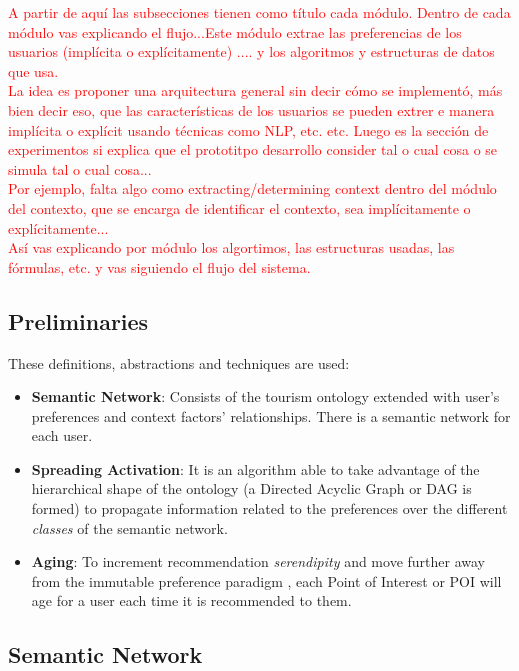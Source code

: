 \textcolor{red}{A partir de aquí las subsecciones tienen como título cada módulo. Dentro de cada módulo vas explicando el flujo...Este módulo extrae las preferencias de los usuarios (implícita o explícitamente) .... y los algoritmos y estructuras de datos que usa.\\ 
La idea es proponer una arquitectura general sin decir cómo se implementó, más bien decir eso, que las características de los usuarios se pueden extrer e manera implícita o explícit usando técnicas como NLP, etc. etc. Luego es la sección de experimentos si explica que el prototitpo desarrollo consider tal o cual cosa o se simula tal o cual cosa...\\
Por ejemplo, falta algo como extracting/determining context dentro del módulo del contexto, que se encarga de identificar el contexto, sea implícitamente o explícitamente...\\
Así vas explicando por módulo los algortimos, las estructuras usadas, las fórmulas, etc. y vas siguiendo el flujo del sistema.}

\subsection{Preliminaries}
These definitions, abstractions and techniques are used:
\begin{itemize}
\item \textbf{Semantic Network}: Consists of the tourism ontology extended with user's preferences and context factors' relationships. There is a semantic network for each user.
\item \textbf{Spreading Activation}: It is an algorithm able to take advantage of the hierarchical shape of the ontology (a Directed Acyclic Graph or DAG is formed) to propagate information related to the preferences over the different \textit{classes} of the semantic network.
\item \textbf{Aging}: To increment recommendation \textit{serendipity} \cite{kotkov2016survey} and move further away from the immutable preference paradigm \cite{pagano2016contextual}, each Point of Interest or POI will age for a user each time it is recommended to them.
\end{itemize}

\subsection{Semantic Network} \label{section:semantic_network}

